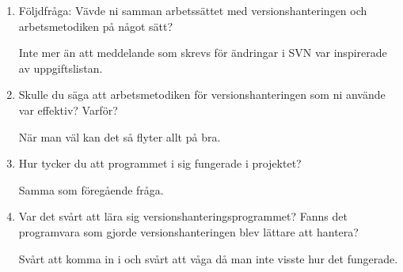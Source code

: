 \begin{enumerate}
  \item Följdfråga: Vävde ni samman arbetssättet med versionshanteringen och arbetsmetodiken på något sätt?

  Inte mer än att meddelande som skrevs för ändringar i SVN var inspirerade av uppgiftslistan.

  \item Skulle du säga att arbetsmetodiken för versionshanteringen som ni använde var effektiv? Varför?

  När man väl kan det så flyter allt på bra.

  \item Hur tycker du att programmet i sig fungerade i projektet?

  Samma som föregående fråga.

  \item Var det svårt att lära sig versionshanteringsprogrammet? Fanns det programvara som gjorde versionshanteringen blev lättare att hantera?

  Svårt att komma in i och svårt att våga då man inte visste hur det fungerade.

\end{enumerate}





